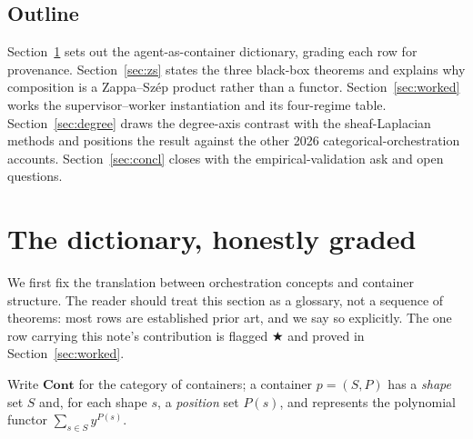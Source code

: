 \documentclass[11pt]{amsart}
\theoremstyle{definition}
\theoremstyle{remark}
\newcommand{\Cont}{\mathbf{Cont}}
\begin{document}
\subsection*{Outline}
Section~\ref{sec:dict} sets out the agent-as-container dictionary, grading each row for
provenance. Section~\ref{sec:zs} states the three black-box theorems and explains why
composition is a Zappa--Sz\'ep product rather than a functor. Section~\ref{sec:worked} works
the supervisor--worker instantiation and its four-regime table. Section~\ref{sec:degree}
draws the degree-axis contrast with the sheaf-Laplacian methods and positions the result against the
other 2026 categorical-orchestration accounts. Section~\ref{sec:concl}
closes with the empirical-validation ask and open questions.

\section{The dictionary, honestly graded}\label{sec:dict}

We first fix the translation between orchestration concepts and container structure. The
reader should treat this section as a glossary, not a sequence of theorems: most rows are
established prior art, and we say so explicitly. The one row carrying this note's contribution
is flagged $\bigstar$ and proved in Section~\ref{sec:worked}.

Write $\Cont$ for the category of containers; a container $p=(S,P)$ has a \emph{shape} set
$S$ and, for each shape $s$, a \emph{position} set $P(s)$, and represents the polynomial
functor $\sum_{s\in S}y^{P(s)}$.
\end{document}

